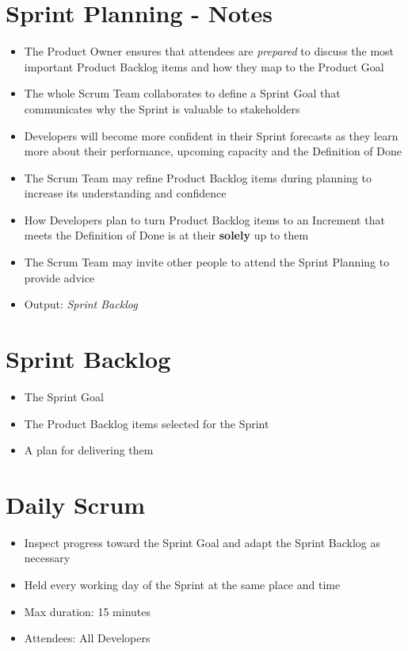 \documentclass[a4paper,11pt,twocolumn]{article}
\begin{document}
\section*{Sprint Planning - Notes}
\begin{itemize}
	\item The Product Owner ensures that attendees are \textit{prepared} to discuss the most important Product Backlog items and how they map to the Product Goal
	\item The whole Scrum Team collaborates to define a Sprint Goal that communicates why the Sprint is valuable to stakeholders
	\item Developers will become more confident in their Sprint forecasts as they learn more about their performance, upcoming capacity and the Definition of Done
	\item The Scrum Team may refine Product Backlog items during planning to increase its understanding and confidence
	\item How Developers plan to turn Product Backlog items to an Increment that meets the Definition of Done is at their \textbf{solely} up to them
	\item The Scrum Team may invite other people to attend the Sprint Planning to provide advice
	\item Output: \textit{Sprint Backlog}
\end{itemize}

\section*{Sprint Backlog}
\begin{itemize}
	\item The Sprint Goal
	\item The Product Backlog items selected for the Sprint
	\item A plan for delivering them
\end{itemize}

\section*{Daily Scrum}
\begin{itemize}
	\item Inspect progress toward the Sprint Goal and adapt the Sprint Backlog as necessary
	\item Held every working day of the Sprint at the same place and time
	\item Max duration: 15 minutes
	\item Attendees: All Developers
\end{itemize}
\end{document}
